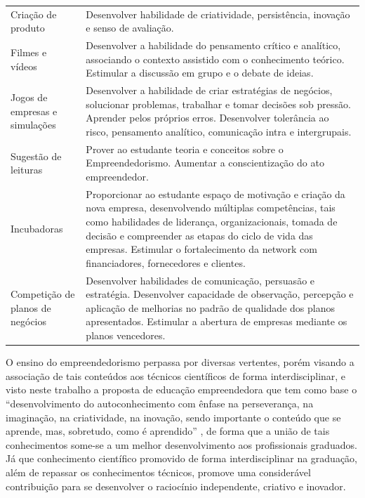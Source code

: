 \begin{center}
\begin{longtable}{p{3.5cm}p{11.0cm}}
Criação de produto & Desenvolver habilidade de criatividade, persistência, inovação e senso de
avaliação. \\ 

Filmes e vídeos & Desenvolver a habilidade do pensamento crítico e analítico, associando o
contexto assistido com o conhecimento teórico. Estimular a discussão em grupo e o debate de ideias. \\ 

Jogos de empresas e simulações & Desenvolver a habilidade de criar estratégias de negócios, solucionar
problemas, trabalhar e tomar decisões sob pressão. Aprender pelos próprios erros. Desenvolver tolerância ao risco, pensamento analítico, comunicação intra e intergrupais. \\ 

Sugestão de leituras & Prover ao estudante teoria e conceitos sobre o Empreendedorismo. Aumentar a conscientização do ato empreendedor. \\ 
Incubadoras & Proporcionar ao estudante espaço de motivação e criação da nova empresa, desenvolvendo múltiplas competências, tais como habilidades de liderança, organizacionais, tomada de decisão e compreender as etapas do ciclo de vida das empresas. Estimular o fortalecimento da network com financiadores, fornecedores e clientes. \\

Competição de planos de negócios & Desenvolver habilidades de comunicação, persuasão e estratégia.
Desenvolver capacidade de observação, percepção e aplicação de melhorias no padrão de qualidade dos planos apresentados. Estimular a abertura de empresas mediante os planos vencedores. \\ 

\end{longtable}
\end{center}


O ensino do empreendedorismo perpassa por diversas vertentes, porém visando a associação de tais conteúdos aos técnicos científicos de forma interdisciplinar, e visto neste trabalho a proposta de educação empreendedora que tem como base o “desenvolvimento do autoconhecimento com ênfase na perseverança, na imaginação, na criatividade, na inovação, sendo importante o conteúdo que se aprende, mas, sobretudo, como é aprendido” \cite{souza_disseminacao_2001}, de forma que a união de tais conhecimentos some-se a um melhor desenvolvimento aos profissionais graduados. Já que conhecimento científico promovido de forma interdisciplinar na graduação, além de repassar os conhecimentos técnicos, promove  uma considerável contribuição para se desenvolver o raciocínio independente, criativo e inovador.

